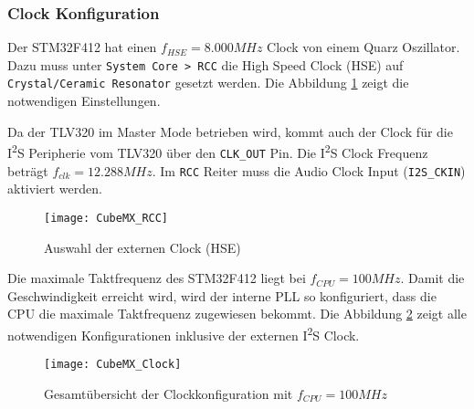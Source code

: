 \subsubsection{Clock Konfiguration}
\label{sec:CubeMXClock}

Der STM32F412 hat einen $f_{HSE}=8.000\si{MHz}$ Clock von einem Quarz Oszillator.
Dazu muss unter \texttt{System Core > RCC} die High Speed Clock (HSE) auf \texttt{Crystal/Ceramic Resonator} gesetzt werden. Die Abbildung \ref{pic:CubeMX_RCC} zeigt die notwendigen Einstellungen.

Da der TLV320 im Master Mode betrieben wird, kommt auch der Clock für die I\textsuperscript{2}S Peripherie vom TLV320 über den \texttt{CLK\_OUT} Pin.
Die I\textsuperscript{2}S Clock Frequenz beträgt $f_{clk}=12.288\si{MHz}$.
Im \texttt{RCC} Reiter muss die Audio Clock Input (\texttt{I2S\_CKIN}) aktiviert werden.

\begin{figure}[H]
	\centering
	\texttt{[image: CubeMX\_RCC]}
	\caption{Auswahl der externen Clock (HSE)}
	\label{pic:CubeMX_RCC}
\end{figure}

Die maximale Taktfrequenz des STM32F412 liegt bei $f_{CPU}=100\si{MHz}$.
Damit die Geschwindigkeit erreicht wird, wird der interne PLL so konfiguriert, dass die CPU die maximale Taktfrequenz zugewiesen bekommt. Die Abbildung \ref{pic:CubeMX_Clock} zeigt alle notwendigen Konfigurationen inklusive der externen I\textsuperscript{2}S Clock.

\begin{figure}[H]
	\centering
	\texttt{[image: CubeMX\_Clock]}
	\caption{Gesamtübersicht der Clockkonfiguration mit $f_{CPU}=100\si{MHz}$}
	\label{pic:CubeMX_Clock}
\end{figure}

\newpage